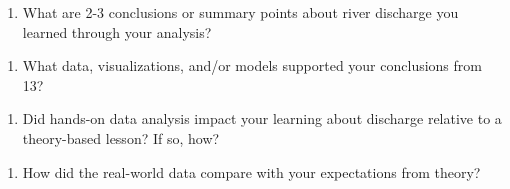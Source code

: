 \documentclass[]{article}
\providecommand{\tightlist}{%
  \setlength{\itemsep}{0pt}\setlength{\parskip}{0pt}}
\begin{document}
\begin{enumerate}
\def\labelenumi{\arabic{enumi}.}
\setcounter{enumi}{12}
\tightlist
\item
  What are 2-3 conclusions or summary points about river discharge you
  learned through your analysis?
\end{enumerate}

\begin{quote}
\end{quote}

\begin{enumerate}
\def\labelenumi{\arabic{enumi}.}
\setcounter{enumi}{13}
\tightlist
\item
  What data, visualizations, and/or models supported your conclusions
  from 13?
\end{enumerate}

\begin{quote}
\end{quote}

\begin{enumerate}
\def\labelenumi{\arabic{enumi}.}
\setcounter{enumi}{14}
\tightlist
\item
  Did hands-on data analysis impact your learning about discharge
  relative to a theory-based lesson? If so, how?
\end{enumerate}

\begin{quote}
\end{quote}

\begin{enumerate}
\def\labelenumi{\arabic{enumi}.}
\setcounter{enumi}{15}
\tightlist
\item
  How did the real-world data compare with your expectations from
  theory?
\end{enumerate}

\begin{quote}
\end{quote}
\end{document}
